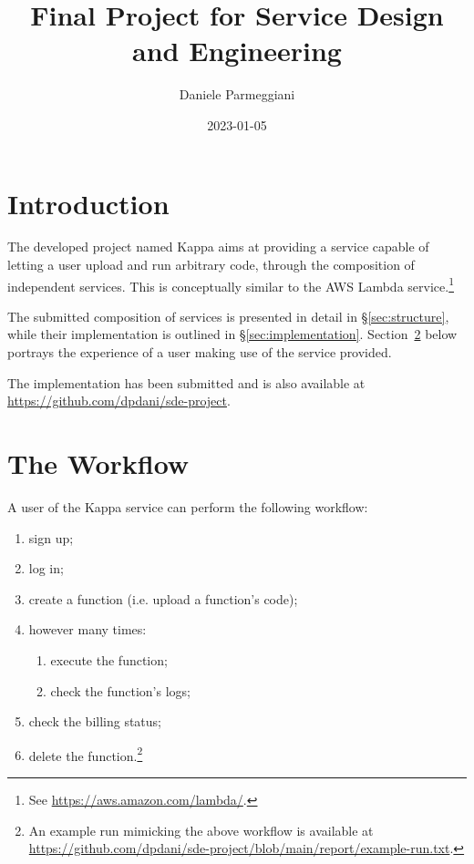 \documentclass[a4paper]{ifacconf}
\begin{document}
    
    \begin{frontmatter}
        \title{Final Project for Service Design and Engineering}
        \author{Daniele Parmeggiani}
        \date{2023-01-05}
    \end{frontmatter}
    
    \section{Introduction}
    
    The developed project named Kappa aims at providing a service capable of letting a user upload and run arbitrary code, through the composition of independent services.
    This is conceptually similar to the AWS Lambda service.\footnote{
        See \url{https://aws.amazon.com/lambda/}.
    }
    
    The submitted composition of services is presented in detail in \S\ref{sec:structure}, while their implementation is outlined in \S\ref{sec:implementation}.
    Section~\ref{sec:workflow} below portrays the experience of a user making use of the service provided.
    
    The implementation has been submitted and is also available at \url{https://github.com/dpdani/sde-project}.
    
    
    \section{The Workflow}\label{sec:workflow}
    
    A user of the Kappa service can perform the following workflow:
    
    \begin{enumerate}
        \item sign up;
        \item log in;
        \item create a function (i.e. upload a function's code);
        \item however many times:
        \begin{enumerate}
            \item execute the function;
            \item check the function's logs;
        \end{enumerate}
        \item check the billing status;
        \item delete the function.\footnote{
            An example run mimicking the above workflow is available at \url{https://github.com/dpdani/sde-project/blob/main/report/example-run.txt}.
        }
    \end{enumerate}
\end{document}
